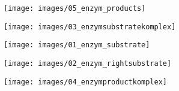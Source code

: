 \documentclass{scrartcl}  %
\begin{document}
				\vspace{0.3cm}
				\noindent
				\begin{minipage}[t]{0.2\textwidth}
					\texttt{[image: images/05\_enzym\_products]}
				\end{minipage}
				\begin{minipage}[t]{0.2\textwidth}
					\texttt{[image: images/03\_enzymsubstratekomplex]}
				\end{minipage}
				\begin{minipage}[t]{0.2\textwidth}
					\texttt{[image: images/01\_enzym\_substrate]}
				\end{minipage}
				\begin{minipage}[t]{0.2\textwidth}
					\texttt{[image: images/02\_enzym\_rightsubstrate]}
				\end{minipage}
				\begin{minipage}[t]{0.2\textwidth}
					\texttt{[image: images/04\_enzymproductkomplex]}
				\end{minipage}
				
\end{document}
